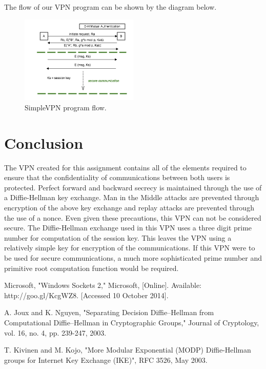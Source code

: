 \documentclass[journal]{IEEEtran}
\begin{document}
The flow of our VPN program can be shown by the diagram below.
\begin{figure}[H]
	\centering
	\caption{SimpleVPN program flow.}	
	\includegraphics[width=0.5\textwidth]{flow_diagram.png}
\end{figure}

\section{Conclusion}
The VPN created for this assignment contains all of the elements required to ensure that the confidentiality of communications between both users is protected. Perfect forward and backward secrecy is maintained through the use of a Diffie-Hellman key exchange. Man in the Middle attacks are prevented through encryption of the above key exchange and replay attacks are prevented through the use of a nonce. Even given these precautions, this VPN can not be considered secure. The Diffie-Hellman exchange used in this VPN uses a three digit prime number for computation of the session key. This leaves the VPN using a relatively simple key for encryption of the communications. If this VPN were to be used for secure communications, a much more sophisticated prime number and primitive root computation function would be required.


\begin{thebibliography}{1}

Microsoft, "Windows Sockets 2," Microsoft, [Online]. Available: http://goo.gl/KcgWZ8. [Accessed 10 October 2014].

A. Joux and K. Nguyen, "Separating Decision Diffie–Hellman from Computational Diffie–Hellman in Cryptographic Groups," Journal of Cryptology, vol. 16, no. 4, pp. 239-247, 2003.

T. Kivinen and M. Kojo, "More Modular Exponential (MODP) Diffie-Hellman groups for Internet Key Exchange (IKE)", RFC 3526, May 2003. 

\end{thebibliography}
\end{document}
